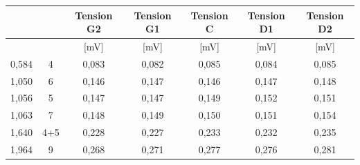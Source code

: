 \documentclass[10pt,a4paper]{report}
\begin{document}
\begin{center}
\begin{tabular}{|c|c|c|c|c|c|c|}
\hline
\rowcolor[HTML]{2A2AA1} 
\cellcolor[HTML]{963400}{\color[HTML]{FFFFFF} N}        & \cellcolor[HTML]{963400}{\color[HTML]{FFFFFF} N} & {\color[HTML]{FFFFFF} Tension G2} & {\color[HTML]{FFFFFF} Tension G1} & {\color[HTML]{FFFFFF} Tension C} & {\color[HTML]{FFFFFF} Tension D1} & {\color[HTML]{FFFFFF} Tension D2} \\ \hline
\rowcolor[HTML]{DDDDFF} 
\cellcolor[HTML]{FFECE2}{\color[HTML]{963400} {[}kg{]}} & \cellcolor[HTML]{FFECE2}{\color[HTML]{963400} }  & {\color[HTML]{2A2AA1} {[}mV{]}}   & {\color[HTML]{2A2AA1} {[}mV{]}}   & {\color[HTML]{2A2AA1} {[}mV{]}}  & {\color[HTML]{2A2AA1} {[}mV{]}}   & {\color[HTML]{2A2AA1} {[}mV{]}}   \\ \hline
{\color[HTML]{963400} 0,584}                            & {\color[HTML]{963400} 4}                         & {\color[HTML]{00009B} 0,083}      & {\color[HTML]{00009B} 0,082}      & {\color[HTML]{00009B} 0,085}     & {\color[HTML]{00009B} 0,084}      & {\color[HTML]{00009B} 0,085}      \\ \hline
{\color[HTML]{963400} 1,050}                            & {\color[HTML]{963400} 6}                         & {\color[HTML]{00009B} 0,146}      & {\color[HTML]{00009B} 0,147}      & {\color[HTML]{00009B} 0,146}     & {\color[HTML]{00009B} 0,147}      & {\color[HTML]{00009B} 0,148}      \\ \hline
{\color[HTML]{963400} 1,056}                            & {\color[HTML]{963400} 5}                         & {\color[HTML]{00009B} 0,147}      & {\color[HTML]{00009B} 0,147}      & {\color[HTML]{00009B} 0,149}     & {\color[HTML]{00009B} 0,152}      & {\color[HTML]{00009B} 0,151}      \\ \hline
{\color[HTML]{963400} 1,063}                            & {\color[HTML]{963400} 7}                         & {\color[HTML]{00009B} 0,148}      & {\color[HTML]{00009B} 0,149}      & {\color[HTML]{00009B} 0,150}     & {\color[HTML]{00009B} 0,151}      & {\color[HTML]{00009B} 0,154}      \\ \hline
{\color[HTML]{963400} 1,640}                            & {\color[HTML]{963400} 4+5}                       & {\color[HTML]{00009B} 0,228}      & {\color[HTML]{00009B} 0,227}      & {\color[HTML]{00009B} 0,233}     & {\color[HTML]{00009B} 0,232}      & {\color[HTML]{00009B} 0,235}      \\ \hline
{\color[HTML]{963400} 1,964}                            & {\color[HTML]{963400} 9}                         & {\color[HTML]{00009B} 0,268}      & {\color[HTML]{00009B} 0,271}      & {\color[HTML]{00009B} 0,277}     & {\color[HTML]{00009B} 0,276}      & {\color[HTML]{00009B} 0,281}      \\ \hline

\end{tabular}
\end{center}
\end{document}
